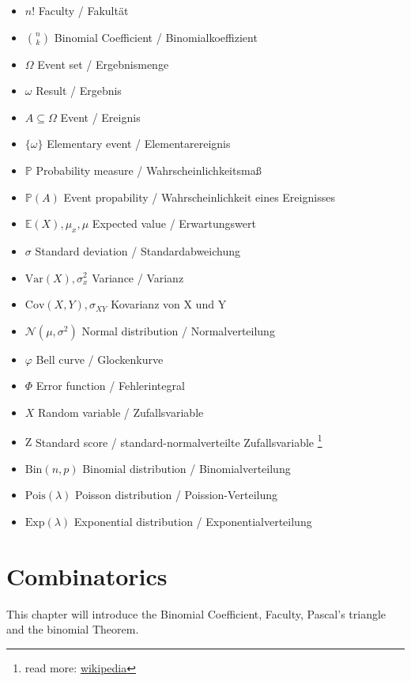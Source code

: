 \documentclass[twoside, a4paper, twocolumn]{article}
\begin{document}
    \begin{itemize}
       \item $n!$ Faculty / Fakultät
       \item $\binom{n}{k}$ Binomial Coefficient / Binomialkoeffizient
       \item $\Omega$ Event set / Ergebnismenge
       \item $\omega$ Result / Ergebnis
       \item $A \subseteq \Omega$ Event / Ereignis
       \item $\{\omega\}$ Elementary event / Elementarereignis
       \item $\mathbb{P}$ Probability measure / Wahrscheinlichkeitsmaß
       \item $\mathbb{P}(A)$ Event propability / Wahrscheinlichkeit eines Ereignisses
       \item $\mathbb{E}(X), \mu_x, \mu$ Expected value / Erwartungswert
       \item $\sigma$ Standard deviation / Standardabweichung
       \item $\mathrm{Var}(X), \sigma^2_x$ Variance / Varianz
       \item $\mathrm{Cov}(X,Y), \sigma_{XY}$ Kovarianz von X und Y
       \item $\mathcal{N}(\mu, \sigma^2)$ Normal distribution / Normalverteilung
       \item $\varphi$ Bell curve / Glockenkurve
       \item $\Phi$ Error function / Fehlerintegral
       \item $X$ Random variable / Zufallsvariable
       \item $\mathrm{Z}$ Standard score / standard-normalverteilte
           Zufallsvariable
           \footnote{read more: \href{https://en.wikipedia.org/wiki/Standard_score}{wikipedia}}
       \item $\textrm{Bin}(n, p)$ Binomial distribution / Binomialverteilung
       \item $\textrm{Pois}(\lambda)$ Poisson distribution / Poission-Verteilung
       \item $\textrm{Exp}(\lambda)$ Exponential distribution / Exponentialverteilung
    \end{itemize}

    \section{Combinatorics}
    This chapter will introduce the Binomial Coefficient, Faculty, Pascal's
    triangle and the binomial Theorem.
\end{document}
